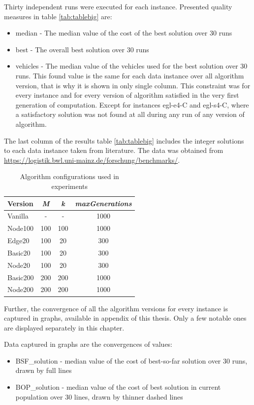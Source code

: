 \documentclass[twoside]{ctuthesis}
\theoremstyle{plain}
\theoremstyle{definition}
\theoremstyle{note}
\begin{document}
Thirty independent runs were executed for each instance. Presented quality measures in table \ref{tab:tablebig} are:
\begin{itemize}
	\item median - The median value of the cost of the best solution over 30 runs 
	\item best - The overall best solution over 30 runs
	\item vehicles - The median value of the vehicles used for the best solution over 30 runs. This found value is the same for each data instance over all algorithm version, that is why it is shown in only single column. This constraint was for every instance and for every version of algorithm satisfied in the very first generation of computation. Except for instances egl-e4-C and egl-s4-C, where a satisfactory solution was not found at all during any run of any version of algorithm.
\end{itemize}
The last column of the results table \ref{tab:tablebig} includes the integer solutions to each data instance taken from literature. The data was obtained from \url{https://logistik.bwl.uni-mainz.de/forschung/benchmarks/}.


\begin{table}[htbp]
	\centering
	\caption{Algorithm configurations used in experiments}
	\label{tab:algorithm-versions}
	\begin{tabular}{|l|c|c|c|}
		\hline
		\textbf{Version} & \textbf{\emph{M}} & \textbf{\emph{k}} & \textbf{\emph{maxGenerations}} \\
		\hline
		Vanilla & - & - & 1000 \\
		Node100 & 100 & 100 & 1000 \\
		Edge20 & 100 & 20 & 300 \\
		Basic20 & 100 & 20 & 300 \\
		Node20 & 100 & 20 & 300 \\
		Basic200 & 200 & 200 & 1000 \\
		Node200 & 200 & 200 & 1000 \\
		\hline
	\end{tabular}
\end{table}


Further, the convergence of all the algorithm versions for every instance is captured in graphs, available in appendix of this thesis. Only a few notable ones are displayed separately in this chapter.

Data captured in graphs are the convergences of values:
\begin{itemize}
	\item BSF\_solution - median value of the cost of best-so-far solution over 30 runs, drawn by full lines
	\item BOP\_solution - median value of the cost of best solution in current population over 30 lines, drawn by thinner dashed lines
\end{itemize}
\end{document}
